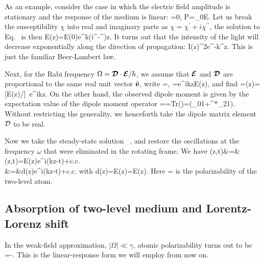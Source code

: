 As an example, consider the case in which the electric field amplitude is stationary and the response of the medium is linear:
\bea
{}=0, \quad \mathcal P=\epsilon_0\chi\mathcal E.
\eea
Let us break the susceptibility $\chi$ into real and imaginary parts as $\chi=\chi^\prime+i\chi^{\prime\prime}$, the solution to Eq.~  is then
\bea
\mathcal E(z)=\mathcal E(0)e^{k(i\chi^\prime-\chi^{\prime\prime})z}.
\eea
It turns out that the intensity of the light will decrease exponentially along the direction of propagation:
\bea
I(z)\propto{}^2\propto e^{-k\chi^{\prime\prime}z}.
\eea
This is just the familiar Beer-Lambert law.

Next, for the Rabi frequency $\Omega=\bdip\cdot\cbE/\hbar$, we assume that $\cbE$ and $\bdip$ are proportional to the same real unit vector $\hat {\bf e}$, write
\bea
\bdip=\dip{}, \quad \cbE=e^{ikz}\mathcal E(z),
\eea
and find
\bea
\Omega=\Omega(z)=[\dip \mathcal E(z)/\hbar]\, e^{ikz}.
\eea
On the other hand, the observed dipole moment is given by the expectation value of the dipole moment operator
\bea
\bd=\langle\hat{\bd}\rangle={\rm Tr}\left(\hat{\bd}\rho\right)=(\dip\rho_{01}+\dip^*\rho_{21}).
\eea
Without restricting the generality, we henceforth take the dipole matrix element $\dip$ to be real.

Now we take the steady-state solution ~, and restore the oscillations at the frequency $\omega$ that were eliminated in the rotating frame. We have
\bea
\bd(z,t)&=&\langle\hat{\bd}\rangle(z,t)=\mathcal E(z)e^{i(kz-\omega t)}+{\rm c.c.}\nonumber\\
&=&d(z)e^{i(kz-\omega t)}+{\rm c.c.}
\eea
with
\bea
d(z)=\mathcal E(z)=\alpha\mathcal E(z).
\eea
Here 
\beq
\alpha=\label{ATOM_POLARIZABILITY}
\eeq
 is the polarizability of the two-level atom.

\subsection{Absorption of two-level medium and Lorentz-Lorenz shift}
In the weak-field approximation, $|\Omega|\ll\gamma$, atomic polarizability turns out to be
\bea
\alpha=-.
\label{POLARIZABILITY}
\eea
This is the linear-response form we will employ from now on.

